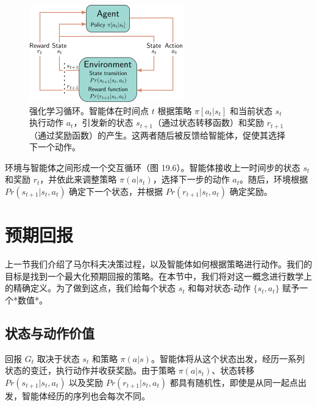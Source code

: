 \begin{figure}[ht!]
\centering
\includegraphics[width=0.7\linewidth]{png/chapter19/ReinforceMDPLoop.png}
\caption{强化学习循环。智能体在时间点 \(t\) 根据策略 \(\pi[a_t|s_t]\) 和当前状态 \(s_t\) 执行动作 \(a_t\)，引发新的状态 \(s_{t+1}\)（通过状态转移函数）和奖励 \(r_{t+1}\)（通过奖励函数）的产生。这两者随后被反馈给智能体，促使其选择下一个动作。}
\end{figure}

环境与智能体之间形成一个交互循环（图 19.6）。智能体接收上一时间步的状态 \(s_t\) 和奖励 \(r_t\)，并依此来调整策略 \(\pi(a|s_t)\)，选择下一步的动作 \(a_t\)。随后，环境根据 \(Pr(s_{t+1}|s_t, a_t)\) 确定下一个状态，并根据 \(Pr(r_{t+1}|s_t, a_t)\) 确定奖励。

\section{预期回报}

上一节我们介绍了马尔科夫决策过程，以及智能体如何根据策略进行动作。我们的目标是找到一个最大化预期回报的策略。在本节中，我们将对这一概念进行数学上的精确定义。为了做到这点，我们给每个状态 \(s_t\) 和每对状态-动作 \(\{s_t, a_t\}\) 赋予一个*数值*。


\subsection{状态与动作价值}

回报 \(G_t\) 取决于状态 \(s_t\) 和策略 \(\pi(a|s)\)。智能体将从这个状态出发，经历一系列状态的变迁，执行动作并收获奖励。由于策略 \(\pi(a|s_t)\)、状态转移 \(Pr(s_{t+1}|s_t, a_t)\) 以及奖励 \(Pr(r_{t+1}|s_t, a_t)\) 都具有随机性，即使是从同一起点出发，智能体经历的序列也会每次不同。

